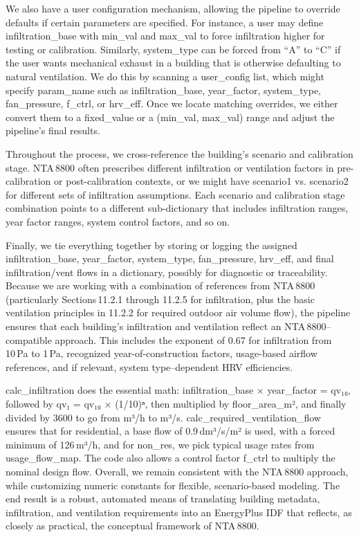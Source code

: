 We also have a user configuration mechanism, allowing the pipeline to override defaults if certain parameters are specified. For instance, a user may define infiltration_base with min_val and max_val to force infiltration higher for testing or calibration. Similarly, system_type can be forced from “A” to “C” if the user wants mechanical exhaust in a building that is otherwise defaulting to natural ventilation. We do this by scanning a user_config list, which might specify param_name such as infiltration_base, year_factor, system_type, fan_pressure, f_ctrl, or hrv_eff. Once we locate matching overrides, we either convert them to a fixed_value or a (min_val, max_val) range and adjust the pipeline’s final results.

Throughout the process, we cross-reference the building’s scenario and calibration stage. NTA 8800 often prescribes different infiltration or ventilation factors in pre-calibration or post-calibration contexts, or we might have scenario1 vs. scenario2 for different sets of infiltration assumptions. Each scenario and calibration stage combination points to a different sub-dictionary that includes infiltration ranges, year factor ranges, system control factors, and so on.

Finally, we tie everything together by storing or logging the assigned infiltration_base, year_factor, system_type, fan_pressure, hrv_eff, and final infiltration/vent flows in a dictionary, possibly for diagnostic or traceability. Because we are working with a combination of references from NTA 8800 (particularly Sections 11.2.1 through 11.2.5 for infiltration, plus the basic ventilation principles in 11.2.2 for required outdoor air volume flow), the pipeline ensures that each building’s infiltration and ventilation reflect an NTA 8800–compatible approach. This includes the exponent of 0.67 for infiltration from 10 Pa to 1 Pa, recognized year-of-construction factors, usage-based airflow references, and if relevant, system type–dependent HRV efficiencies.

calc_infiltration does the essential math: infiltration_base × year_factor = qv₁₀, followed by qv₁ = qv₁₀ × (1/10)ⁿ, then multiplied by floor_area_m², and finally divided by 3600 to go from m³/h to m³/s. calc_required_ventilation_flow ensures that for residential, a base flow of 0.9 dm³/s/m² is used, with a forced minimum of 126 m³/h, and for non_res, we pick typical usage rates from usage_flow_map. The code also allows a control factor f_ctrl to multiply the nominal design flow. Overall, we remain consistent with the NTA 8800 approach, while customizing numeric constants for flexible, scenario-based modeling. The end result is a robust, automated means of translating building metadata, infiltration, and ventilation requirements into an EnergyPlus IDF that reflects, as closely as practical, the conceptual framework of NTA 8800.